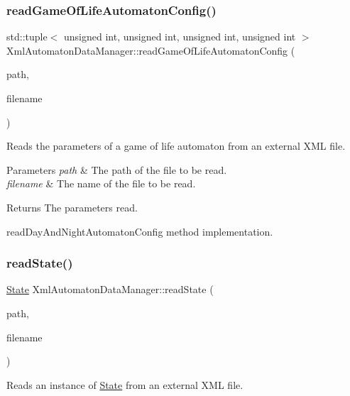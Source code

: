 \subsubsection{\texorpdfstring{read\+Game\+Of\+Life\+Automaton\+Config()}{readGameOfLifeAutomatonConfig()}}
{\footnotesize\ttfamily std\+::tuple$<$ unsigned int, unsigned int, unsigned int, unsigned int $>$ Xml\+Automaton\+Data\+Manager\+::read\+Game\+Of\+Life\+Automaton\+Config (\begin{DoxyParamCaption}\item[{Q\+String}]{path,  }\item[{Q\+String}]{filename }\end{DoxyParamCaption})}

Reads the parameters of a game of life automaton from an external X\+ML file.


\begin{DoxyParams}{Parameters}
{\em path} & The path of the file to be read. \\
\hline
{\em filename} & The name of the file to be read. \\
\hline
\end{DoxyParams}
\begin{DoxyReturn}{Returns}
The parameters read.
\end{DoxyReturn}
read\+Day\+And\+Night\+Automaton\+Config method implementation. \mbox{\label{class_xml_automaton_data_manager_a5d5eea4ab9989ee0e412c38d56aa5fcf}} 
\subsubsection{\texorpdfstring{read\+State()}{readState()}}
{\footnotesize\ttfamily \mbox{\hyperlink{class_state}{State}} Xml\+Automaton\+Data\+Manager\+::read\+State (\begin{DoxyParamCaption}\item[{Q\+String}]{path,  }\item[{Q\+String}]{filename }\end{DoxyParamCaption})}

Reads an instance of \mbox{\hyperlink{class_state}{State}} from an external X\+ML file.


